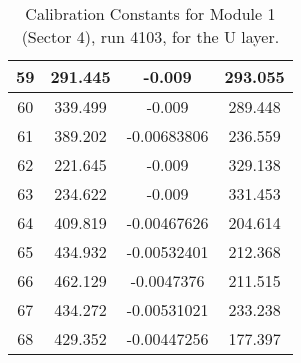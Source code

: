\begin{table}[h]
{\begin{tabular}{|c|c|c|c|}
59	&	291.445	&	-0.009	&	293.055	\\	\hline
60	&	339.499	&	-0.009	&	289.448	\\	\hline
61	&	389.202	&	-0.00683806	&	236.559	\\	\hline
62	&	221.645	&	-0.009	&	329.138	\\	\hline
63	&	234.622	&	-0.009	&	331.453	\\	\hline
64	&	409.819	&	-0.00467626	&	204.614	\\	\hline
65	&	434.932	&	-0.00532401	&	212.368	\\	\hline
66	&	462.129	&	-0.0047376	&	211.515	\\	\hline
67	&	434.272	&	-0.00531021	&	233.238	\\	\hline
68	&	429.352	&	-0.00447256	&	177.397	\\	\hline 
        \end{tabular}
        }
        \caption{Calibration Constants for Module 1 (Sector 4), run 4103, for the U layer.}
\end{table}


